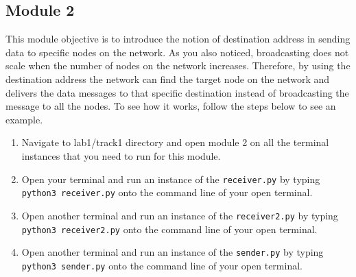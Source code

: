 \documentclass[11pt]{article}
\begin{document}

\subsection{Module 2}
\label{subsec:module2}
This module objective is to introduce the notion of destination address in sending data to specific nodes on the network. As you also noticed, broadcasting does not scale when the number of nodes on the network increases. Therefore, by using the destination address the network can find the target node on the network and delivers the data messages to that specific destination instead of broadcasting the message to all the nodes. To see how it works, follow the steps below to see an example.


\begin{enumerate}
    \item Navigate to lab1/track1 directory and open module 2 on all the terminal instances that you need to run for this module.
    \item Open your terminal and run an instance of the \texttt{receiver.py} by typing \texttt{python3 receiver.py} onto the command line of your open terminal.
    \item Open another terminal and run an instance of the \texttt{receiver2.py} by typing \texttt{python3 receiver2.py} onto the command line of your open terminal.
    \item Open another terminal and run an instance of the \texttt{sender.py} by typing \texttt{python3 sender.py} onto the command line of your open terminal.
\end{enumerate}


\end{document}
